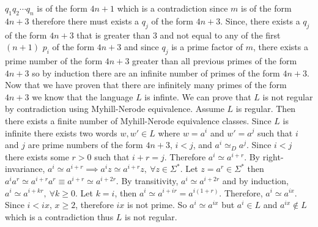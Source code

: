 \documentclass[12pt]{article}
\begin{document}
$q_1q_2\cdots q_n$ is of the form $4n+1$ which is a contradiction since $m$ is
of the form $4n+3$ therefore there must exists a $q_j$ of the form $4n+3$.
Since, there exists a $q_j$ of the form $4n+3$ that is greater than $3$ and not
equal to any of the first $(n+1)$ $p_i$ of the form $4n+3$ and since $q_j$ is a
prime factor of $m$, there exists a prime number of the form $4n+3$ greater than
all previous primes of the form $4n+3$ so by induction there are an infinite
number of primes of the form $4n+3$.
\medskip
\newline
Now that we have proven that there are infinitely many primes of the form $4n+3$
we know that the language $L$ is infinte. We can prove that $L$ is not regular
by contradiction using Myhill-Nerode equivalence. Assume $L$ is regular. Then
there exists a finite number of Myhill-Nerode equivalence classes. Since $L$ is
infinite there exists two words $w,w' \in L$ where $w = a^i$ and $w' = a^j$ such
that $i$ and $j$ are prime numbers of the form $4n+3$, $i <j$, and
$a^i \simeq_D a^j$.
Since $i < j$ there exists
some $r > 0$ such that $i + r  = j$. Therefore $a^i \simeq a^{i+r}$.
By right-invariance, $a^i \simeq a^{i+r} \implies a^{i}z \simeq a^{i+r}z,
\ \forall z \in \Sigma^*$. Let $z = a^r \in \Sigma^*$ then
$a^{i}a^{r} \simeq a^{i+r}a^{r} \equiv
a^{i+r} \simeq a^{i+2r}$. By transitivity, $a^i \simeq a^{i+2r}$ and by
induction, $a^i \simeq a^{i + kr},\ \forall k \ge 0$. Let $k = i$, then
$a^i \simeq a^{i+ir} = a^{i(1+r)}$. Therefore, $a^i \simeq a^{ix}$.
Since $i < ix$, $x \ge 2$, therefore $ix$ is not prime. So
$a^i \simeq a^{ix}$ but $a^i \in L$ and $a^{ix} \notin L$ which is a
contradiction thus $L$ is not regular.
\end{document}
